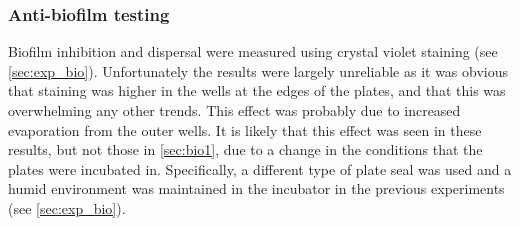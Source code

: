\subsubsection{Anti-biofilm testing}

Biofilm inhibition and dispersal were measured using crystal violet staining  (see \ref{sec:exp_bio}). Unfortunately the results were largely unreliable as it was obvious that staining was higher in the wells at the edges of the plates, and that this was overwhelming any other trends. This effect was probably due to increased evaporation from the outer wells. 
It is likely that this effect was seen in these results, but not those in \ref{sec:bio1}, due to a change in the conditions that the plates were incubated in. Specifically, a different type of plate seal was used and a humid environment was maintained in the incubator in the previous experiments (see \ref{sec:exp_bio}).